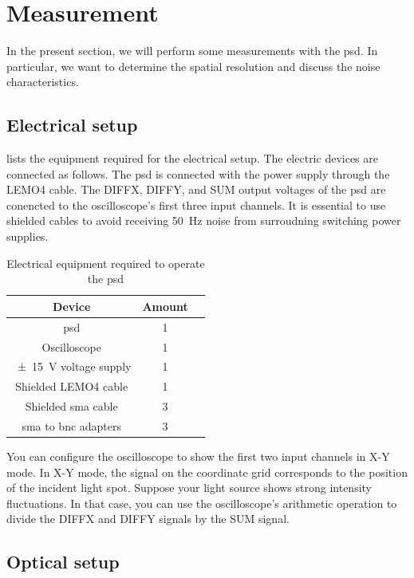 \section{Measurement}

In the present section, we will perform some measurements with the \gls{psd}.
In particular, we want to determine the spatial resolution and discuss the noise characteristics.

\subsection{Electrical setup}

 lists the equipment required for the electrical setup.
The electric devices are connected as follows.
The \gls{psd} is connected with the power supply through the LEMO4 cable.
The DIFFX, DIFFY, and SUM output voltages of the \gls{psd} are conencted to the oscilloscope's first three input channels.
It is essential to use shielded cables to avoid receiving \SI{50}{\hertz} noise from surroudning switching power supplies.

\begin{table}[htb]
  \centering
  \begin{tabular}{ccl}
    \toprule
      Device & Amount \\
    \midrule
      \gls{psd} & 1\\
      Oscilloscope & 1\\
      \SI{\pm15}{\volt} voltage supply & 1\\
      Shielded LEMO4 cable & 1\\
      Shielded \acrshort{sma} cable & 3\\
      \acrshort{sma} to \acrshort{bnc} adapters & 3\\
    \bottomrule
  \end{tabular}
  \captionsetup{width=.8\textwidth}
  \caption{Electrical equipment required to operate the \gls{psd}}\label{tab:equipment}
\end{table}

You can configure the oscilloscope to show the first two input channels in X-Y mode.
In X-Y mode, the signal on the coordinate grid corresponds to the position of the incident light spot.
Suppose your light source shows strong intensity fluctuations.
In that case, you can use the oscilloscope's arithmetic operation to divide the DIFFX and DIFFY signals by the SUM signal.

\subsection{Optical setup}

